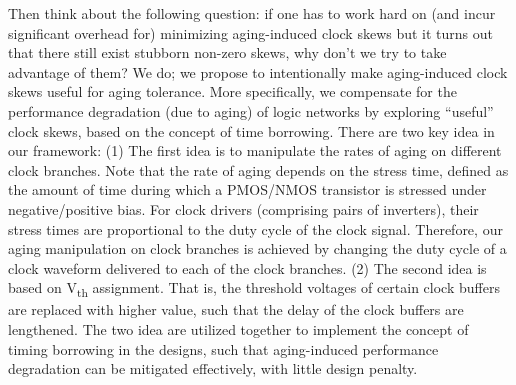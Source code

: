 Then think about the following question: if one has to work hard on (and incur significant overhead for) minimizing aging-induced clock skews but it turns out that there still exist stubborn non-zero skews, why don't we try to take advantage of them? We do; we propose to intentionally make aging-induced clock skews useful for aging tolerance. More specifically, we compensate for the performance degradation (due to aging) of logic networks by exploring \enquote{useful} clock skews, based on the concept of time borrowing. There are two key idea in our framework: (1) The first idea is to manipulate the rates of aging on different clock branches. Note that the rate of aging depends on the stress time, defined as the amount of time during which a PMOS/NMOS transistor is stressed under negative/positive bias. For clock drivers (comprising pairs of inverters), their stress times are proportional to the duty cycle of the clock signal. Therefore, our aging manipulation on clock branches is achieved by changing the duty cycle of a clock waveform delivered to each of the clock branches. (2) The second idea is based on V\textsubscript{th} assignment. That is, the threshold voltages of  certain clock buffers are replaced with higher value, such that the delay of the clock buffers are lengthened. The two idea are utilized together to implement the concept of timing borrowing in the designs, such that aging-induced performance degradation can be mitigated effectively, with little design penalty.
\begin{comment}
Then think about the following question: if one has to work hard on (and incur significant overhead for) minimizing aging-induced clock skews but it turns out that there still exist stubborn non-zero skews, why don't we try to take advantage of them? We do; we propose to intentionally make aging-induced clock skews useful for aging tolerance. More specifically, we compensate for the performance degradation (due to aging) of logic networks by exploring \enquote{useful} aging-induced clock skews, based on the concept of time borrowing. Note that the rate of aging depends on the stress time, defined as the amount of time during which a PMOS/NMOS transistor is stressed under negative/positive bias. For clock drivers (comprising pairs of inverters), their stress times are proportional to the duty cycle of the clock signal. The key idea of our framework is to manipulate the rates of aging on different clock branches, by changing the duty cycle of a clock waveform delivered to each of the clock branches. The proposed framework succeeds in mitigating effective aging-induced performance degradation with little design penalty.
\end{comment}